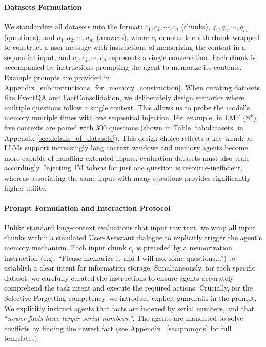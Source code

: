 \paragraph{Datasets Formulation}
We standardize all datasets into the format: ${c_1, c_2, \cdots, c_n}$ (chunks), ${q_1, q_2, \cdots, q_m}$ (questions), and ${a_1, a_2, \cdots, a_m}$ (answers), where $c_i$ denotes the $i$-th chunk wrapped to construct a user message with instructions of memorizing the content in a sequential input, and ${c_1, c_2, \cdots, c_n}$ represents a single conversation. Each chunk is accompanied by instructions prompting the agent to memorize its contents. Example prompts are provided in Appendix~\ref{sub:instructions_for_memory_construction}. When curating datasets like EventQA and FactConsolidation, we deliberately design scenarios where multiple questions follow a single context. This allows us to probe the model’s memory multiple times with one sequential injection. For example, in LME (S*), five contexts are paired with 300 questions (shown in Table \ref{tab:datasets} in Appendix \ref{sec:details_of_datasets}). This design choice reflects a key trend: as LLMs support increasingly long context windows and memory agents become more capable of handling extended inputs, evaluation datasets must also scale accordingly. Injecting 1M tokens for just one question is resource-inefficient, whereas associating the same input with many questions provides significantly higher utility. 


\paragraph{Prompt Formulation and Interaction Protocol} Unlike standard long-context evaluations that input raw text, we wrap all input chunks within a simulated User-Assistant dialogue to explicitly trigger the agent's memory mechanism. Each input chunk $c_i$ is preceded by a memorization instruction (e.g., ``Please memorize it and I will ask some questions...'') to establish a clear intent for information storage. Simultaneously, for each specific dataset, we carefully curated the instructions to ensure agents accurately comprehend the task intent and execute the required actions.  Crucially, for the Selective Forgetting competency, we introduce explicit guardrails in the prompt. We explicitly instruct agents that facts are indexed by serial numbers, and that ``\textit{newer facts have larger serial numbers.}''. The agents are mandated to solve conflicts by finding the newest fact (see Appendix ~\ref{sec:prompts} for full templates).





